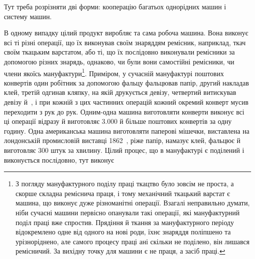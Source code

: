 Тут треба розрізняти дві форми: кооперацію багатьох однорідних
машин і систему машин.

В одному випадку цілий продукт виробляє та сама робоча
машина. Вона виконує всі ті різні операції, що їх виконував своїм
знаряддям ремісник, наприклад, ткач своїм ткацьким варстатом,
або ті, що їх послідовно виконували ремісники за допомогою
різних знарядь, однаково, чи були вони самостійні ремісники,
чи члени якоїсь мануфактури\footnote{
З погляду мануфактурного поділу праці ткацтво було зовсім не
проста, а скорше складна реміснича праця, і тому механічний ткацький
варстат є машина, що виконує дуже різноманітні операції. Взагалі неправильно
думати, ніби сучасні машини первісно опанували такі операції,
які мануфактурний поділ праці вже спростив. Прядіння й ткання за мануфактурного
періоду відокремлено одне від одного на нові роди, їхнє знаряддя
поліпшено та урізноріднено, але самого процесу праці ані скільки
не поділено, він лишався ремісничий. За вихідну точку для машини є не
праця, а засіб праці.
}. Приміром, у сучасній мануфактурі
поштових конвертів один робітник за допомогою фальцу
фальцював папір, другий накладав клей, третій одгинав кляпку,
на якій друкується девізу, четвертий витискував девізу й~,
і при кожній з цих частинних операцій кожний окремий конверт
мусив переходити з рук до рук. Одним-одна машина виготовляти
конверти виконує всі ці операції відразу й виготовляє \num{3.000} й
більше поштових конвертів за одну годину. Одна американська
машина виготовляти паперові мішечки, виставлена на лондонській
промисловій виставці 1862~, ріже папір, намазує клей,
фальцює й виготовляє 300 штук за хвилину. Цілий процес, що в
мануфактурі є поділений і виконується послідовно, тут виконує
\parbreak{}  %
